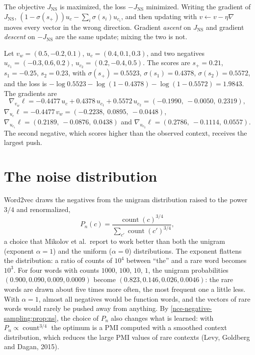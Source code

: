 \begin{notechapter}
\begin{pitfall}[Signs]
The objective $J_{\mathrm{NS}}$ is maximized, the loss $-J_{\mathrm{NS}}$ minimized. Writing the gradient of $J_{\mathrm{NS}}$,
$(1 - \sigma(s_+))u_c - \sum_i\sigma(s_i)u_{c_i}$, and then updating with $v\leftarrow v - \eta\nabla$
moves every vector in the wrong direction. Gradient \emph{ascent} on $J_{\mathrm{NS}}$ and gradient \emph{descent} on $-J_{\mathrm{NS}}$
are the same update; mixing the two is not.
\end{pitfall}

\begin{example}\label{nce-negative-sampling:ex:update}
Let $v_w = (0.5, -0.2, 0.1)$, $u_c = (0.4, 0.1, 0.3)$, and two negatives $u_{c_1} = (-0.3, 0.6, 0.2)$, $u_{c_2} = (0.2, -0.4, 0.5)$. The scores are
$s_+ = 0.21$, $s_1 = -0.25$, $s_2 = 0.23$, with $\sigma(s_+) = 0.5523$, $\sigma(s_1) = 0.4378$, $\sigma(s_2) = 0.5572$, and the loss is
$-\log0.5523 - \log(1 - 0.4378) - \log(1 - 0.5572) = 1.9843$. The gradients are
\[
  \nabla_{v_w}\ell = -0.4477\,u_c + 0.4378\,u_{c_1} + 0.5572\,u_{c_2} = (-0.1990,\ -0.0050,\ 0.2319),
\]
$\nabla_{u_c}\ell = -0.4477\,v_w = (-0.2238,\ 0.0895,\ -0.0448)$, $\nabla_{u_{c_1}}\ell = (0.2189,\ -0.0876,\ 0.0438)$ and $\nabla_{u_{c_2}}\ell = (0.2786,\ -0.1114,\ 0.0557)$.
The second negative, which scores higher than the observed context, receives the largest push.
\end{example}

\section{The noise distribution}\label{nce-negative-sampling:sec:noise}

Word2vec draws the negatives from the unigram distribution raised to the power $3/4$ and
renormalized,
\[
  P_n(c) = \frac{\operatorname{count}(c)^{3/4}}{\sum_{c'}\operatorname{count}(c')^{3/4}},
\]
a choice that Mikolov et al.\ report to work better than both the unigram (exponent $\alpha = 1$) and the uniform
($\alpha = 0$) distributions. The exponent flattens the distribution: a ratio of counts of $10^4$ between ``the'' and a
rare word becomes $10^3$. For four words with counts $1000$, $100$, $10$, $1$, the unigram probabilities $(0.900,
0.090, 0.009, 0.0009)$ become $(0.823, 0.146, 0.026, 0.0046)$: the rare words are drawn about five times more
often, the most frequent one a little less. With $\alpha = 1$, almost all negatives would be function
words, and the vectors of rare words would rarely be pushed away from anything. By
\cref{nce-negative-sampling:prop:ns}, the choice of $P_n$ also changes what is learned: with $P_n\propto\operatorname{count}^{3/4}$
the optimum is a PMI computed with a smoothed context distribution, which reduces the
large PMI values of rare contexts (Levy, Goldberg and Dagan, 2015).


\end{notechapter}
